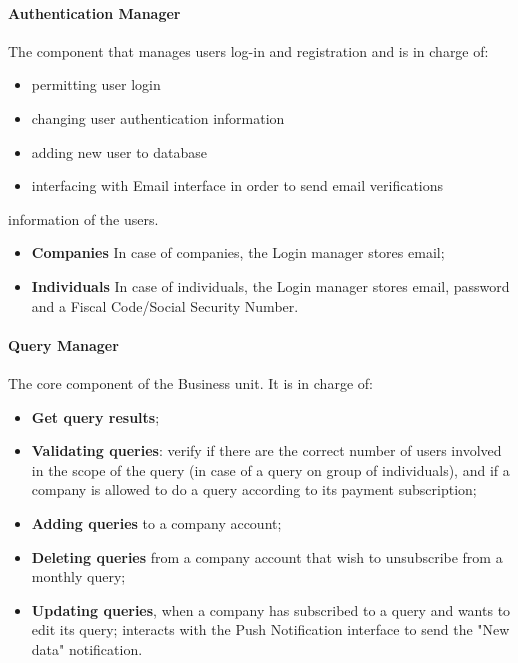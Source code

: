 \paragraph{Authentication Manager} \mbox{} \newline
The component that manages users log-in and registration and is in charge of:
\begin{itemize}
    \item permitting user login
    \item changing user authentication information
    \item adding new user to database
    \item interfacing with Email interface in order to send email verifications
\end{itemize}
information of the users.
\begin{itemize}
    \item \textbf{Companies}
    In case of companies, the Login manager stores email;
    \item \textbf{Individuals}
    In case of individuals, the Login manager stores email, password and a Fiscal Code/Social Security Number.
\end{itemize}

\paragraph{Query Manager} \mbox{} \newline
The core component of the Business unit. It is in charge of:
\begin{itemize}
    \item \textbf{Get query results};
    \item \textbf{Validating queries}: verify if there are the correct number of users involved in the scope of the query (in case of a query on group of individuals), and if a company is allowed to do a query according to its payment subscription;
    \item \textbf{Adding queries} to a company account;
    \item \textbf{Deleting queries} from a company account that wish to unsubscribe from a monthly query;
    \item \textbf{Updating queries}, when a company has subscribed to a query and wants to edit its query; interacts with the Push Notification interface to send the "New data" notification.
\end{itemize}

